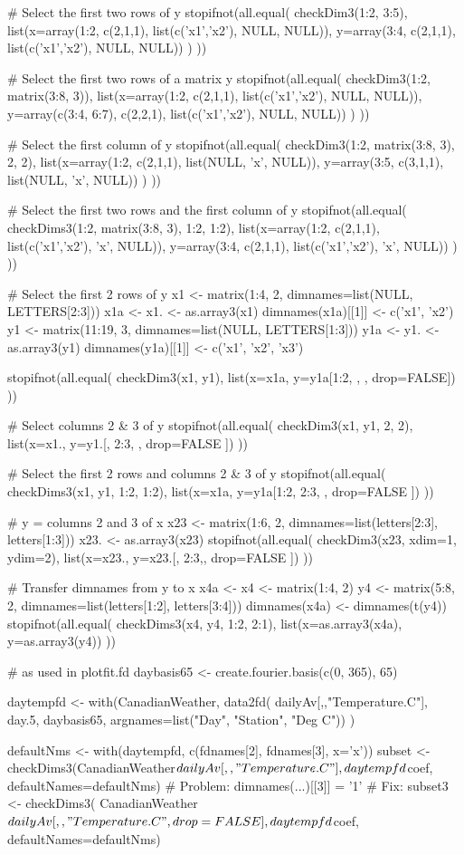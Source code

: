 \documentclass{article}
\begin{document}
\begin{Examples}
\begin{ExampleCode}
# Select the first two rows of y 
stopifnot(all.equal( 
checkDim3(1:2, 3:5),
list(x=array(1:2, c(2,1,1), list(c('x1','x2'), NULL, NULL)), 
     y=array(3:4, c(2,1,1), list(c('x1','x2'), NULL, NULL)) )
)) 

# Select the first two rows of a matrix y 
stopifnot(all.equal(
checkDim3(1:2, matrix(3:8, 3)),
list(x=array(1:2,         c(2,1,1), list(c('x1','x2'), NULL, NULL)), 
     y=array(c(3:4, 6:7), c(2,2,1), list(c('x1','x2'), NULL, NULL)) )
))

# Select the first column of y
stopifnot(all.equal(
checkDim3(1:2, matrix(3:8, 3), 2, 2), 
list(x=array(1:2,         c(2,1,1), list(NULL, 'x', NULL)), 
     y=array(3:5, c(3,1,1), list(NULL, 'x', NULL)) )
))

# Select the first two rows and the first column of y
stopifnot(all.equal(
checkDims3(1:2, matrix(3:8, 3), 1:2, 1:2),
list(x=array(1:2, c(2,1,1), list(c('x1','x2'), 'x', NULL)), 
     y=array(3:4, c(2,1,1), list(c('x1','x2'), 'x', NULL)) ) 
))

# Select the first 2 rows of y 
x1 <- matrix(1:4, 2, dimnames=list(NULL, LETTERS[2:3]))
x1a <- x1. <- as.array3(x1)
dimnames(x1a)[[1]] <- c('x1', 'x2') 
y1 <- matrix(11:19, 3, dimnames=list(NULL, LETTERS[1:3]))
y1a <- y1. <- as.array3(y1) 
dimnames(y1a)[[1]] <- c('x1', 'x2', 'x3')

stopifnot(all.equal(
checkDim3(x1, y1),
list(x=x1a, y=y1a[1:2, , , drop=FALSE])
))

# Select columns 2 & 3 of y 
stopifnot(all.equal(
checkDim3(x1, y1, 2, 2),
list(x=x1., y=y1.[, 2:3, , drop=FALSE ])
))

# Select the first 2 rows and  columns 2 & 3 of y 
stopifnot(all.equal(
checkDims3(x1, y1, 1:2, 1:2),
list(x=x1a, y=y1a[1:2, 2:3, , drop=FALSE ])
)) 

# y = columns 2 and 3 of x 
x23 <- matrix(1:6, 2, dimnames=list(letters[2:3], letters[1:3]))
x23. <- as.array3(x23) 
stopifnot(all.equal(
checkDim3(x23, xdim=1, ydim=2),
list(x=x23., y=x23.[, 2:3,, drop=FALSE ])
))

# Transfer dimnames from y to x
x4a <- x4 <- matrix(1:4, 2)
y4 <- matrix(5:8, 2, dimnames=list(letters[1:2], letters[3:4]))
dimnames(x4a) <- dimnames(t(y4))
stopifnot(all.equal(
checkDims3(x4, y4, 1:2, 2:1),
list(x=as.array3(x4a), y=as.array3(y4))
))

# as used in plotfit.fd
daybasis65 <- create.fourier.basis(c(0, 365), 65)

daytempfd <- with(CanadianWeather, data2fd(
       dailyAv[,,"Temperature.C"], day.5, 
       daybasis65, argnames=list("Day", "Station", "Deg C")) )

defaultNms <- with(daytempfd, c(fdnames[2], fdnames[3], x='x'))
subset <- checkDims3(CanadianWeather$dailyAv[, , "Temperature.C"],
               daytempfd$coef, defaultNames=defaultNms)
# Problem:  dimnames(...)[[3]] = '1' 
# Fix:  
subset3 <- checkDims3(
        CanadianWeather$dailyAv[, , "Temperature.C", drop=FALSE],
               daytempfd$coef, defaultNames=defaultNms)
\end{ExampleCode}
\end{Examples}
\end{document}
